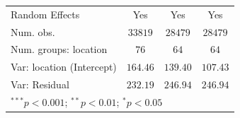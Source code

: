 \documentclass[
  11pt,
]{article}
\begin{document}
\begin{table}
\begin{center}
\begin{tabular}{l c c c}
\hline
Random Effects               & Yes        & Yes        & Yes          \\
Num. obs.                    & $33819$    & $28479$    & $28479$      \\
Num. groups: location        & $76$       & $64$       & $64$         \\
Var: location (Intercept)    & $164.46$   & $139.40$   & $107.43$     \\
Var: Residual                & $232.19$   & $246.94$   & $246.94$     \\
\hline
\multicolumn{4}{l}{\scriptsize{$^{***}p<0.001$; $^{**}p<0.01$; $^{*}p<0.05$}}
\end{tabular}
\label{tab:obs-test}
\end{center}
\end{table}
\end{document}
